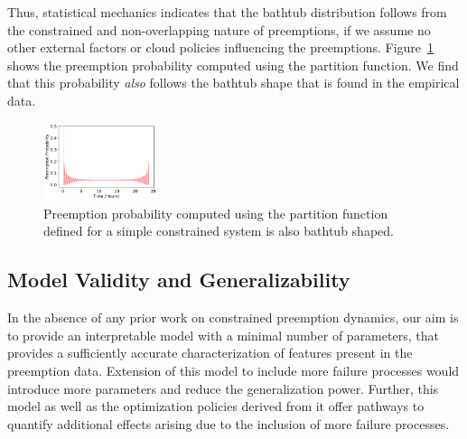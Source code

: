 Thus, statistical mechanics indicates that the bathtub distribution follows from the constrained and non-overlapping nature of preemptions, if we assume no other external factors or cloud policies influencing the preemptions. 
Figure~\ref{fig:partfun} shows the preemption probability computed using the partition function.
We find that this probability \emph{also} follows the bathtub shape that is found in the empirical data. 




\begin{figure}[t]
  \centering
  \includegraphics[width=0.3\textwidth]{../graphs/analytical_prob.pdf}
  \caption{Preemption probability computed using the partition function defined for a simple constrained system is also bathtub shaped.}
  \label{fig:partfun}
\end{figure}



\subsection{Model Validity and Generalizability}

In the absence of any prior work on constrained preemption dynamics, our aim is to provide an interpretable model with a minimal number of parameters, that provides a sufficiently accurate characterization of features present in the preemption data. 
Extension of this model to include more failure processes would introduce more parameters and reduce the generalization power. Further, this model as well as the optimization policies derived from it offer pathways to quantify additional effects arising due to the inclusion of more failure processes.  

